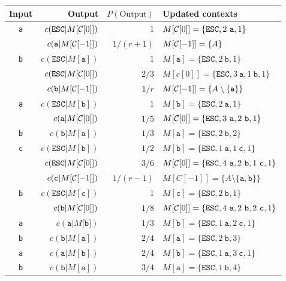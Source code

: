 \documentclass{article}
\begin{document}
\thispagestyle{empty}
\begin{tabular}{crrl}
  Input & Output & $P(\text{Output})$ & Updated contexts\\
  \hline
  {\tt a} & $c(\mathtt{ESC}|M[{\cal C}[0]])$ & $1$ & $M[{\cal C}[0]]=\{\mathtt{ESC},2~\mathtt{a},1\}$\\
  ~ & $c(\mathtt{a}|M[{\cal C}[-1]])$ & $1/(r+1)$ & $M[{\cal C}[-1]]=\{A\}$\\
  {\tt b} & $c(\mathtt{ESC}|M[\texttt{a}])$ & $1$ & $M[\mathtt{a}]=\{\mathtt{ESC},2~\mathtt{b},1\}$\\
  ~ & $c(\mathtt{ESC}|M[{\cal C}[0]])$ & $2/3$ & $M[c[0]]=\{\mathtt{ESC},3~\mathtt{a},1~\mathtt{b},1\}$\\
  ~ & $c(\mathtt{b}|M[{\cal C}[-1]])$ & $1/r$ & $M[{\cal C}[-1]]=\{A\setminus\{\mathtt{a}\}\}$ \\
  {\tt a} & $c(\mathtt{ESC}|M[\texttt{b}])$ & $1$ & $M[\mathtt{b}]=\{\mathtt{ESC},2~\mathtt{a},1\}$\\
 ~ & $c(\mathtt a|M[{\cal C}[0]])$ & $1/5$ & $M[{\cal C}[0]]=\{\mathtt{ESC},3~\mathtt{a},2~\mathtt{b},1\}$\\
  {\tt b} & $c(\mathtt b|M[\mathtt{a}])$ & $1/3$ & $M[\mathtt{a}]=\{\mathtt{ESC},2~\mathtt{b},2\}$\\
  {\tt c} & $c(\mathtt{ESC}|M[\mathtt{b}])$ & $1/2$ & $M[\mathtt{b}]=\{\mathtt{ESC},1~\mathtt{a},1~\mathtt{c},1\}$\\
  ~ & $c(\mathtt{ESC}|M[{\cal C}[0]])$ & $3/6$ & $M[{\cal C}[0]]=\{\mathtt{ESC},4~\mathtt{a},2~\mathtt{b},1~\mathtt{c},1\}$\\
  ~ & $c(\mathtt c|M[{\cal C}[-1]])$ & $1/(r-1)$ & $M[C[-1]]=\{A\setminus\{\mathtt{a},\mathtt{b}\}\}$\\
  {\tt b} & $c(\mathtt{ESC}|M[\texttt{c}])$ & $1$ & $M[\mathtt{c}]=\{\mathtt{ESC},2~\mathtt{b},1\}$\\
  ~ & $c(\mathtt b|M[{\cal C}[0]])$ & $1/8$ & $M[{\cal C}[0]]=\{\mathtt{ESC},4~\mathtt{a},2~\mathtt{b},2~\mathtt{c},1\}$\\
  {\tt a} & $c(\mathtt a|M[\mathtt{b]})$ & $1/3$ & $M[\mathtt{b}]=\{\mathtt{ESC},1~\mathtt{a},2~\mathtt{c},1\}$\\
  {\tt b} & $c(\mathtt b|M[\mathtt{a}])$ & $2/4$ & $M[\mathtt{a}]=\{\mathtt{ESC},2~\mathtt{b},3\}$\\
  {\tt a} & $c(\mathtt a|M[\mathtt{b}])$ & $2/4$ & $M[\mathtt{b}]=\{\mathtt{ESC},1~\mathtt{a},3~\mathtt{c},1\}$\\
  {\tt b} & $c(\mathtt b|M[\mathtt{a}])$ & $3/4$ & $M[\mathtt{a}]=\{\mathtt{ESC},1~\mathtt{b},4\}$\\

\end{tabular}
\end{document}

